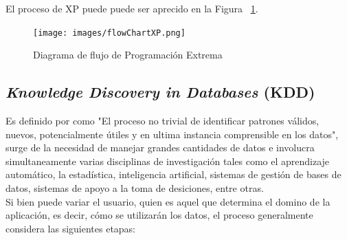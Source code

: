 El proceso de XP puede puede ser aprecido en la Figura ~\ref{fig:procesoXP}.

\begin{figure}[H]
	\centering
	\captionsetup{justification=centering}
	\texttt{[image: images/flowChartXP.png]}
	\caption[Diagrama de flujo de Programación Extrema.]{Diagrama de flujo de Programación Extrema}
	\label{fig:procesoXP}
\end{figure}

\subsection{\textit{Knowledge Discovery in Databases} (KDD)}
\label{subsec:kdd}

Es definido por \cite{KDDFayyad} como "El proceso no trivial de identificar patrones válidos, nuevos, potencialmente útiles y en ultima instancia comprensible en los datos", surge de la necesidad de manejar grandes cantidades de datos e involucra simultaneamente varias disciplinas de investigación tales como el aprendizaje automático, la estadística, inteligencia artificial, sistemas de gestión de bases de datos, sistemas de apoyo a la toma de desiciones, entre otras.\\

Si bien puede variar el usuario, quien es aquel que determina el domino de la aplicación, es decir, cómo se utilizarán los datos, el proceso generalmente considera las siguientes etapas:

